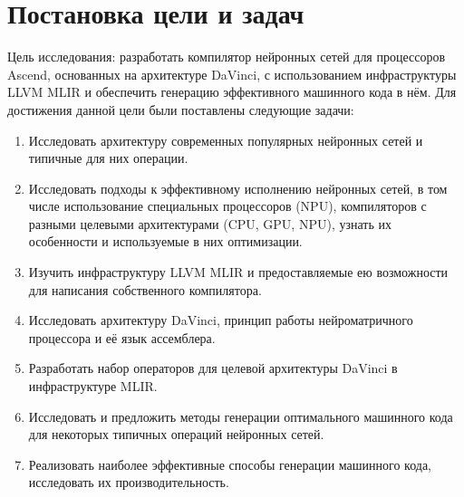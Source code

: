 \section{Постановка цели и задач}
\label{sec:Goals} 

Цель исследования: разработать компилятор нейронных сетей для процессоров
Ascend, основанных на архитектуре DaVinci, с использованием инфраструктуры
LLVM MLIR и обеспечить генерацию эффективного машинного кода в нём.
Для достижения данной цели были поставлены следующие задачи:

\begin{enumerate}
    \item Исследовать архитектуру современных популярных нейронных сетей
          и типичные для них операции.
    \item Исследовать подходы к эффективному исполнению нейронных сетей,
          в том числе использование специальных процессоров (NPU),
          компиляторов с разными целевыми архитектурами (CPU, GPU, NPU),
          узнать их особенности и используемые в них оптимизации.
    \item Изучить инфраструктуру LLVM MLIR и предоставляемые ею возможности
          для написания собственного компилятора.
    \item Исследовать архитектуру DaVinci, принцип работы нейроматричного
          процессора и её язык ассемблера.
    \item Разработать набор операторов для целевой архитектуры DaVinci в
          инфраструктуре MLIR.
    \item Исследовать и предложить методы генерации оптимального машинного
          кода для некоторых типичных операций нейронных сетей.
    \item Реализовать наиболее эффективные способы генерации машинного кода,
          исследовать их производительность.
\end{enumerate}

\newpage

